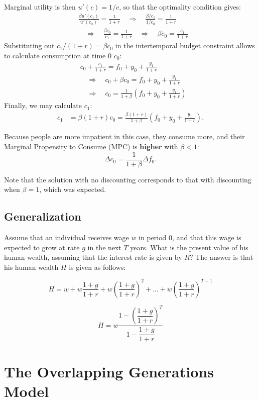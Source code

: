 \documentclass[]{book}
\theoremstyle{definition}
\theoremstyle{definition}
\theoremstyle{definition}
\theoremstyle{remark}
\begin{document}
Marginal utility is then \(u'(c)=1/c\), so that the optimality condition
gives: \[
\begin{aligned}
& \frac{\beta u'(c_{1})}{u'(c_{0})}=\frac{1}{1+r} \quad \Rightarrow \quad \frac{\beta/c_1}{1/c_0}=\frac{1}{1+r} \\
& \quad \Rightarrow \quad \frac{\beta c_0}{c_1}=\frac{1}{1+r} \quad \Rightarrow \quad \beta c_{0}=\frac{c_{1}}{1+r}
\end{aligned}
\] Substituting out \(c_{1}/(1+r)=\beta c_0\) in the intertemporal
budget constraint allows to calculate consumption at time \(0\) \(c_0\):
\[
\begin{aligned}
&c_{0}+\frac{c_{1}}{1+r}=f_{0}+y_{0}+\frac{y_{1}}{1+r}\\
&\quad \Rightarrow \quad c_{0}+\beta c_0=f_{0}+y_{0}+\frac{y_{1}}{1+r}\\
&\quad \Rightarrow \quad c_{0}=\frac{1}{1+\beta}\left(f_{0}+y_{0}+\frac{y_{1}}{1+r}\right)
\end{aligned}
\] Finally, we may calculate \(c_1\): \[
\begin{aligned}
c_{1}&=\beta (1+r)c_0=\frac{\beta(1+r)}{1+\beta}\left(f_{0}+y_{0}+\frac{y_{1}}{1+r}\right).
\end{aligned}
\]

Because people are more impatient in this case, they consume more, and
their Marginal Propensity to Consume (MPC) is \textbf{higher} with
\(\beta<1\): \[\Delta c_0 = \frac{1}{1+\beta}\Delta f_0.\]

Note that the solution with no discounting corresponds to that with
discounting when \(\beta=1\), which was expected.

\section{Generalization}\label{generalization}

Assume that an individual receives wage \(w\) in period \(0\), and that
this wage is expected to grow at rate \(g\) in the next \(T\) years.
What is the present value of his human wealth, assuming that the
interest rate is given by \(R\)? The answer is that his human wealth
\(H\) is given as follows:

\[H =w+w\frac{1+g}{1+r}+w\left(\frac{1+g}{1+r}\right)^{2}+...+w\left(\frac{1+g}{1+r}\right)^{T-1}\]

\[H =w\frac{1-\left(\dfrac{1+g}{1+r}\right)^{T}}{1-\dfrac{1+g}{1+r}}\]

\hypertarget{olg}{\chapter{The Overlapping Generations
Model}\label{olg}}
\end{document}
